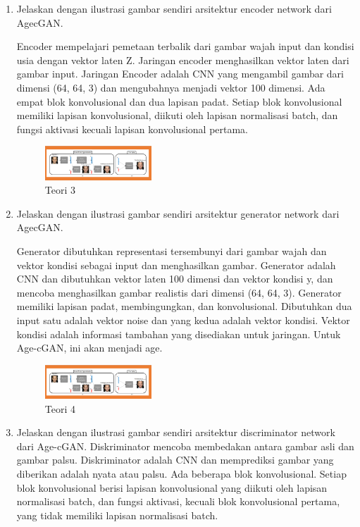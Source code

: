 \begin{enumerate}
	\item Jelaskan dengan ilustrasi gambar sendiri arsitektur encoder network dari AgecGAN.

	\hfill\break
	Encoder mempelajari pemetaan terbalik dari gambar wajah input dan kondisi usia dengan vektor laten Z. Jaringan encoder menghasilkan vektor laten dari gambar input. Jaringan Encoder adalah CNN yang mengambil gambar dari dimensi (64, 64, 3) dan mengubahnya menjadi vektor 100 dimensi. Ada empat blok konvolusional dan dua lapisan padat. Setiap blok konvolusional memiliki lapisan konvolusional, diikuti oleh lapisan normalisasi batch, dan fungsi aktivasi kecuali lapisan konvolusional pertama.

	\begin{figure}[H]
	\centering
		\includegraphics[width=4cm]{figures/1174021/tugas9/materi/teori345.PNG}
		\caption{Teori 3}
	\end{figure}

	\item Jelaskan dengan ilustrasi gambar sendiri arsitektur generator network dari AgecGAN.

	\hfill\break
	Generator dibutuhkan representasi tersembunyi dari gambar wajah dan vektor kondisi sebagai input dan menghasilkan gambar. Generator adalah CNN dan dibutuhkan vektor laten 100 dimensi dan vektor kondisi y, dan mencoba menghasilkan gambar realistis dari dimensi (64, 64, 3). Generator memiliki lapisan padat, membingungkan, dan konvolusional. Dibutuhkan dua input satu adalah vektor noise dan yang kedua adalah vektor kondisi. Vektor kondisi adalah informasi tambahan yang disediakan untuk jaringan. Untuk Age-cGAN, ini akan menjadi age.

	\begin{figure}[H]
	\centering
		\includegraphics[width=4cm]{figures/1174021/tugas9/materi/teori345.PNG}
		\caption{Teori 4}
	\end{figure}

	\item Jelaskan dengan ilustrasi gambar sendiri arsitektur discriminator network dari Age-cGAN.
	\hfill\break
	Diskriminator mencoba membedakan antara gambar asli dan gambar palsu. Diskriminator adalah CNN dan memprediksi gambar yang diberikan adalah nyata atau palsu. Ada beberapa blok konvolusional. Setiap blok konvolusional berisi lapisan konvolusional yang diikuti oleh lapisan normalisasi batch, dan fungsi aktivasi, kecuali blok konvolusional pertama, yang tidak memiliki lapisan normalisasi batch.


\end{enumerate}
